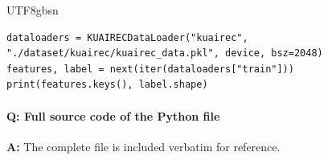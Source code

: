 \documentclass[11pt]{article}
\begin{document}
\begin{CJK*}{UTF8}{gbsn}
\begin{Verbatim}[fontsize=\small]
dataloaders = KUAIRECDataLoader("kuairec", "./dataset/kuairec/kuairec_data.pkl", device, bsz=2048)
features, label = next(iter(dataloaders["train"]))
print(features.keys(), label.shape)
\end{Verbatim}

\paragraph{Q: Full source code of the Python file}
\textbf{A:} The complete file is included verbatim for reference.


\end{CJK*}
\end{document}
